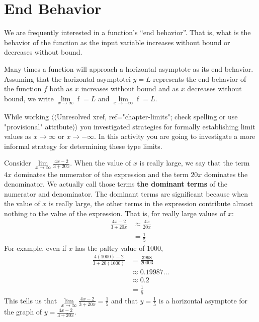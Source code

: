 \documentclass[12pt,]{book}
\newcommand{\terminology}[1]{\textbf{#1}}
\theoremstyle{plain}
\theoremstyle{definition}
\numberwithin{equation}{section}
\newcommand{\fe}[2]{\mathop{{#1}{\left(#2\right)}}}
\begin{document}
\section[End Behavior]{End Behavior}\label{section-end-behavior}
We are frequently interested in a function's ``end behavior''.  That is, what is the behavior of the function as the input variable increases without bound or decreases without bound.%
\par
Many times a function will approach a horizontal asymptote as its end behavior.  Assuming that the horizontal asymptotei \(y=L\) represents the end behavior of the function \(f\) both as \(x\) increases without bound and as \(x\) decreases without bound, we write \(\lim\limits_{x\to\infty}\fe{f}{x}=L\) and \(\lim\limits_{x\to-\infty}\fe{f}{x}=L\).%
\par
While working {$\langle\langle$Unresolved xref, ref="chapter-limits"; check spelling or use "provisional" attribute$\rangle\rangle$} you investigated strategies for formally establishing limit values as \(x\to\infty\) or \(x\to-\infty\).  In this activity you are going to investigate a more informal strategy for determining these type limits.%
\par
Consider \(\lim\limits_{x\to\infty}\frac{4x-2}{3+20x}\). When the value of \(x\) is really large, we say that the term \(4x\) dominates the numerator of the expression and the term \(20x\) dominates the denominator. We actually call those terms \terminology{the dominant terms} of the numerator and denominator.  The dominant terms are significant because when the value of \(x\) is really large, the other terms in the expression contribute almost nothing to the value of the expression.   That is, for really large values of \(x\):\begin{align*}
\frac{4x-2}{3+20x}&\approx\frac{4x}{20x}\\
&=\frac{1}{5}
\end{align*}For example, even if \(x\) has the paltry value of \(1000\), \begin{align*}
\frac{4(1000)-2}{3+20(1000)}&=\frac{3998}{20003}\\
&\approx0.19987\ldots\\
&\approx0.2\\
&=\frac{1}{5}
\end{align*}This tells us that \(\lim\limits_{x\to\infty}\frac{4x-2}{3+20x}=\frac{1}{5}\) and that \(y=\frac{1}{5}\) is a horizontal asymptote for the graph of \(y=\frac{4x-2}{3+20x}\).%
\typeout{************************************************}
\typeout{************************************************}
\end{document}
